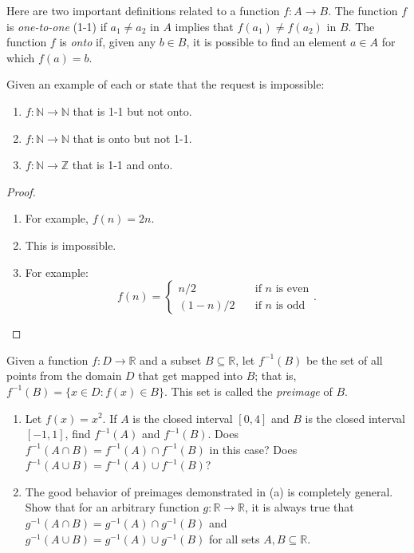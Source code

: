 \documentclass[class=understanding-analysis,crop=false]{standalone}
\begin{document}
\begin{exercise}
    \par Here are two important definitions related to a function $f: A\to B$. The function $f$ is \textit{one-to-one} (1-1) if $a_{1}\ne a_{2}$ in $A$ implies that $f(a_{1})\ne f(a_{2})$ in $B$. The function $f$ is \textit{onto} if, given any $b\in B$, it is possible to find an element $a\in A$ for which $f(a) = b$.
    \par Given an example of each or state that the request is impossible:
    \begin{enumerate}[label = (\alph*)]
        \item $f : \mathbb{N} \to \mathbb{N}$ that is 1-1 but not onto.
        \item $f : \mathbb{N} \to \mathbb{N}$ that is onto but not 1-1.
        \item $f : \mathbb{N} \to \mathbb{Z}$ that is 1-1 and onto.
    \end{enumerate}
\end{exercise}

\begin{proof}
    \begin{enumerate}[label = (\alph*)]
        \item For example, $f(n) = 2n$.
        \item This is impossible.
        \item For example:
              \[
                  f(n) =
                  \begin{cases}
                      n/2     & \quad\text{if $n$ is even} \\
                      (1-n)/2 & \quad\text{if $n$ is odd}
                  \end{cases}.
              \]
    \end{enumerate}
\end{proof}

\begin{exercise}
    \par Given a function $f: D\to\mathbb{R}$ and a subset $B\subseteq\mathbb{R}$, let $f^{-1}(B)$ be the set of all points from the domain $D$ that get mapped into $B$; that is, $f^{-1}(B) = \{ x\in D : f(x) \in B \}$. This set is called the \textit{preimage} of $B$.
    \begin{enumerate}[label = (\alph*)]
        \item Let $f(x) = x^{2}$. If $A$ is the closed interval $[0, 4]$ and $B$ is the closed interval $[-1, 1]$, find $f^{-1}(A)$ and $f^{-1}(B)$. Does $f^{-1}(A\cap B) = f^{-1}(A)\cap f^{-1}(B)$ in this case? Does $f^{-1}(A\cup B) = f^{-1}(A)\cup f^{-1}(B)$?
        \item The good behavior of preimages demonstrated in (a) is completely general. Show that for an arbitrary function $g: \mathbb{R} \to \mathbb{R}$, it is always true that $g^{-1}(A\cap B) = g^{-1}(A) \cap g^{-1}(B)$ and $g^{-1}(A\cup B) = g^{-1}(A) \cup g^{-1}(B)$ for all sets $A, B\subseteq\mathbb{R}$.
    \end{enumerate}
\end{exercise}
\end{document}
